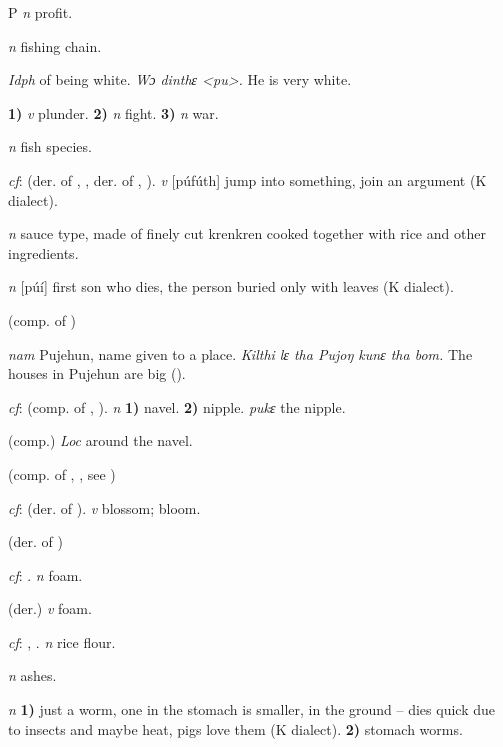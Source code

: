 \begin{letter}{P}
 \textit{n} profit.

 \textit{n} fishing chain.

 \textit{Idph} of being white. \textit{Wɔ dinthɛ <pu>.} He is very white.

 \textbf{1)} \textit{v} plunder. \textbf{2)} \textit{n} fight. \textbf{3)} \textit{n} war.

 \textit{n} fish species.

 \textit{cf}:  (der. of , , der. of , ). \textit{v} [púfúth] jump into something, join an argument (K dialect). 

 \textit{n} sauce type, made of finely cut krenkren cooked together with rice and other ingredients.

\textit{n} [púí] first son who dies, the person buried only with leaves (K dialect). 

 (comp. of ) 

 \textit{nam} Pujehun, name given to a place. \textit{Kilthi lɛ tha Pujoŋ kunɛ tha bom.} The houses in Pujehun are big (\citealt{Pichl1967}).

 \textit{cf}:  (comp. of , ). \textit{n} \textbf{1)} navel. \textbf{2)} nipple. \textit{pukɛ} the nipple.

 (comp.) \textit{Loc} around the navel.

 (comp. of , , see ) 

 \textit{cf}:  (der. of ). \textit{v} blossom; bloom.

 (der. of ) 

 \textit{cf}: . \textit{n} foam.

 (der.) \textit{v} foam.

 \textit{cf}: , . \textit{n} rice flour.

 \textit{n} ashes.

 \textit{n} \textbf{1)} just a worm, one in the stomach is smaller, in the ground – dies quick due to insects and maybe heat, pigs love them (K dialect). \textbf{2)} stomach worms.


\end{letter}
